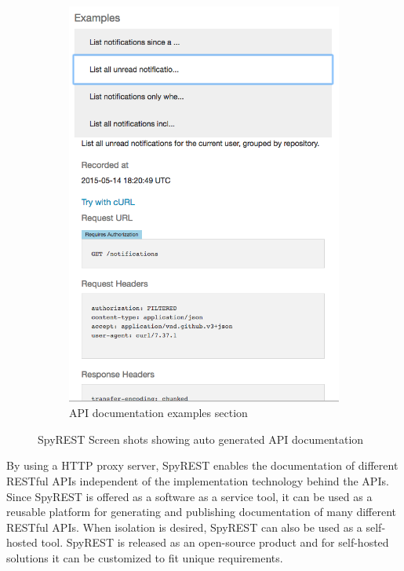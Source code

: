 \documentclass[conference]{IEEEtran}
\begin{document}
\begin{figure}[!tbh]
\begin{subfigure}[t]{0.5\textwidth}
    \includegraphics[width=\linewidth]{examples.png}
    \caption{API documentation examples section}
    \label{fig:examples}
  \end{subfigure}
  \caption{SpyREST Screen shots showing auto generated API documentation}
  \label{fig:spyrest_screenshots}
\end{figure}

By using a HTTP proxy server, SpyREST enables the documentation of different RESTful APIs independent of the implementation technology behind the APIs. Since SpyREST is offered as a software as a service tool, it can be used as a reusable platform for generating and publishing documentation of many different RESTful APIs. When isolation is desired, SpyREST can also be used as a self-hosted tool. SpyREST is released as an open-source product and for self-hosted solutions it can be customized to fit unique requirements.
\end{document}

